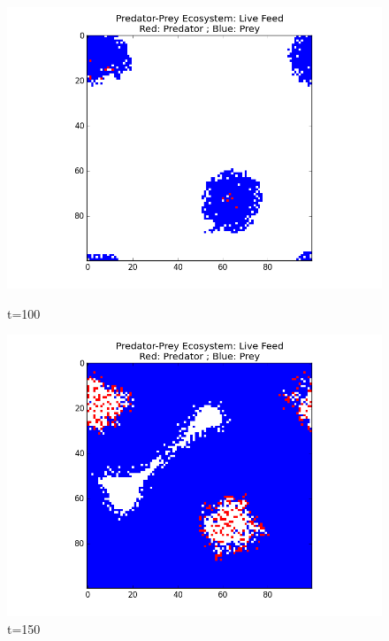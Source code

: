 \documentclass[a4paper,12pt]{article}
\begin{document}
  \begin{figure}[H]
  \centering        
	\begin{minipage}[b]{.45\linewidth}
		 \includegraphics[width = 1\linewidth]{./pics/ecosystem_snapshot_100.png} 
                 \caption{t=100}
        \end{minipage}  
        \quad
	\begin{minipage}[b]{.45\linewidth}		 
		 \includegraphics[width = 1\linewidth]{./pics/ecosystem_snapshot_150.png} 
                 \caption{t=150}
        \end{minipage}  
  \end{figure}       
\end{document}
